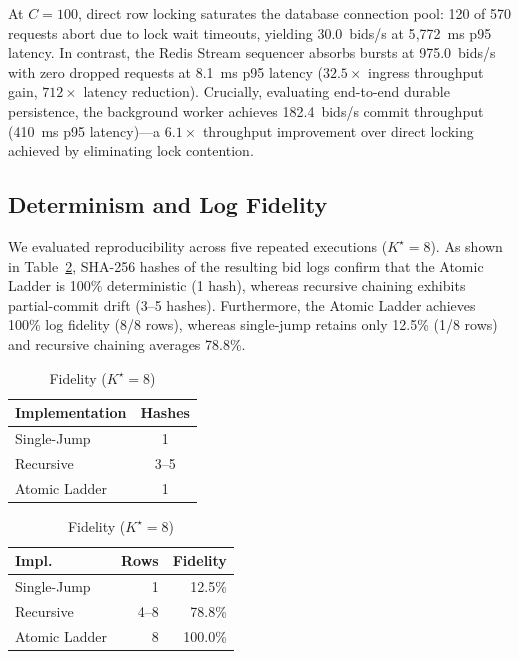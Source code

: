 \documentclass[conference]{IEEEtran}
\begin{document}
At $C=100$, direct row locking saturates the database connection pool: 120 of 570 requests abort
due to lock wait timeouts, yielding 30.0~bids/s at 5{,}772~ms p95 latency. In contrast, the Redis
Stream sequencer absorbs bursts at 975.0~bids/s with zero dropped requests at 8.1~ms p95 latency
($32.5\times$ ingress throughput gain, $712\times$ latency reduction). Crucially, evaluating
end-to-end durable persistence, the background worker achieves 182.4~bids/s commit throughput
(410~ms p95 latency)---a $\mathbf{6.1\times}$ throughput improvement over direct locking achieved
by eliminating lock contention.

\subsection{Determinism and Log Fidelity}
We evaluated reproducibility across five repeated executions ($K^\star = 8$). As shown in
Table~\ref{tab:benchmarks}, SHA-256 hashes of the resulting bid logs confirm that the Atomic
Ladder is 100\% deterministic (1 hash), whereas recursive chaining exhibits partial-commit drift
(3--5 hashes). Furthermore, the Atomic Ladder achieves 100\% log fidelity (8/8 rows), whereas
single-jump retains only 12.5\% (1/8 rows) and recursive chaining averages 78.8\%.

\begin{table}[htbp]
\centering
\begin{minipage}{0.48\columnwidth}
\centering
\footnotesize
\begin{tabular}{lc}
\toprule
\textbf{Implementation} & \textbf{Hashes} \\
\midrule
Single-Jump   & 1 \\
Recursive     & 3--5 \\
Atomic Ladder & 1 \\
\bottomrule
\end{tabular}
\caption{Determinism (5 Runs)}
\label{tab:determinism}
\end{minipage}\hfill
\begin{minipage}{0.48\columnwidth}
\centering
\footnotesize
\begin{tabular}{lrr}
\toprule
\textbf{Impl.} & \textbf{Rows} & \textbf{Fidelity} \\
\midrule
Single-Jump   & 1   & 12.5\% \\
Recursive     & 4--8 & 78.8\% \\
Atomic Ladder & 8   & 100.0\% \\
\bottomrule
\end{tabular}
\caption{Fidelity ($K^\star=8$)}
\label{tab:fidelity}
\end{minipage}
\label{tab:benchmarks}
\end{table}
\end{document}

